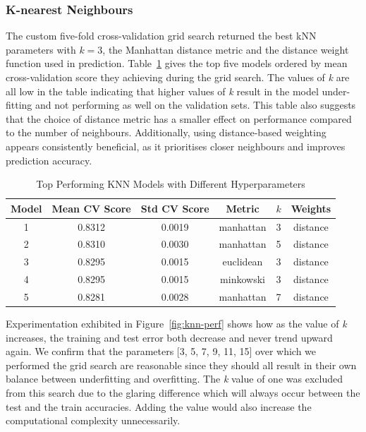 \documentclass[10pt, conference]{IEEEtran}
\begin{document}
\subsubsection{K-nearest Neighbours}
The custom five-fold cross-validation grid search returned the best kNN parameters with $k=3$, the Manhattan distance metric and the distance weight function used in prediction. Table~\ref{tab:knn_comparison} gives the top five models ordered by mean cross-validation score they achieving during the grid search. The values of \textit{k} are all low in the table indicating that higher values of \textit{k} result in the model under-fitting and not performing as well on the validation sets. This table also suggests that the choice of distance metric has a smaller effect on performance compared to the number of neighbours. Additionally, using distance-based weighting appears consistently beneficial, as it prioritises closer neighbours and improves prediction accuracy.

\begin{table}[htbp]
	\caption{Top Performing KNN Models with Different Hyperparameters}
	\centering
	\begin{tabular}{|c|c|c|c|c|c|}
		\hline
		\textbf{Model} & \textbf{Mean CV Score} & \textbf{Std CV Score} & \textbf{Metric} & \textbf{$k$} & \textbf{Weights} \\ \hline
		1 & 0.8312 & 0.0019 & manhattan & 3 & distance \\ \hline
		2 & 0.8310 & 0.0030 & manhattan & 5 & distance \\ \hline
		3 & 0.8295 & 0.0015 & euclidean & 3 & distance \\ \hline
		4 & 0.8295 & 0.0015 & minkowski & 3 & distance \\ \hline
		5 & 0.8281 & 0.0028 & manhattan & 7 & distance \\ \hline
	\end{tabular}
	\label{tab:knn_comparison}
\end{table}


Experimentation exhibited in Figure~\ref{fig:knn-perf} shows how as the value of \textit{k} increases, the training and test error both decrease and never trend upward again. We confirm that the parameters [3, 5, 7, 9, 11, 15] over which we performed the grid search are reasonable since they should all result in their own balance between underfitting and overfitting. The \textit{k} value of one was excluded from this search due to the glaring difference which will always occur between the test and the train accuracies. Adding the value would also increase the computational complexity unnecessarily.
\end{document}

